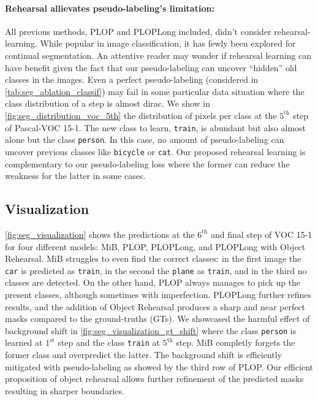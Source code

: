 \paragraph{Rehearsal allievates pseudo-labeling's limitation:\,} All previous methods, PLOP
and PLOPLong included, didn't consider rehearsal-learning. While popular in image classification, it
has fewly been explored for continual segmentation. An attentive reader may wonder if rehearsal
learning can have benefit given the fact that our pseudo-labeling can uncover ``hidden'' old classes
in the images. Even a perfect pseudo-labeling (considered in \autoref{tab:seg_ablation_classif}) may
fail in some particular data situation where the class distribution of a step is almost dirac. We
show in \autoref{fig:seg_distribution_voc_5th} the distribution of pixels per class at the
$5^{\text{th}}$ step of Pascal-VOC 15-1. The new class to learn, \texttt{train}, is abundant but
also almost alone but the class \texttt{person}. In this case, no amount of pseudo-labeling can
uncover previous classes like \texttt{bicycle} or \texttt{cat}. Our proposed rehearsal learning is
complementary to our pseudo-labeling loss where the former can reduce the weakness for the latter in
some cases.

\subsection{Visualization}

\autoref{fig:seg_visualization} shows the predictions at the $6^\text{th}$ and final step of VOC
15-1 for four different models: MiB, PLOP, PLOPLong, and PLOPLong with Object Rehearsal. MiB
struggles to even find the correct classes: in the first image the \texttt{car} is predicted as
\texttt{train}, in the second the \texttt{plane} as \texttt{train}, and in the third no classes are
detected. On the other hand, PLOP always manages to pick up the present classes, although sometimes
with imperfection. PLOPLong further refines results, and the addition of Object Rehearsal produces a
sharp and near perfect masks compared to the ground-truths (GTs). We showcased the harmful effect of
background shift in \autoref{fig:seg_visualization_gt_shift} where the class \texttt{person} is
learned at $1^\text{st}$ step and the class \texttt{train} at $5^\text{th}$ step. MiB completly
forgets the former class and overpredict the latter. The background shift is efficiently mitigated
with pseudo-labeling as showed by the third row of PLOP. Our efficient proposition of object
rehearsal allows further refinement of the predicted masks resulting in sharper boundaries.

